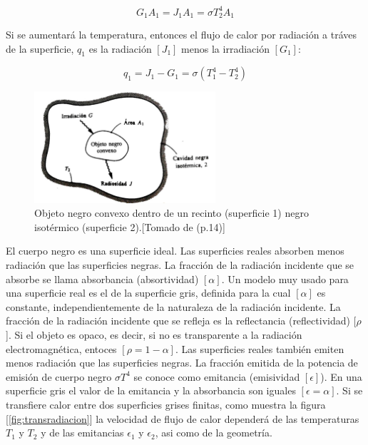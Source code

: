 \documentclass[12pt,letterpaper]{article}     %
\begin{document}
 \begin{equation}
 G_{1}A_{1} = J_{1}A_{1} = \sigma T_{2}^{4}A_{1} 
     \label{eq:Boltzmann2}
 \end{equation}
 
 Si se aumentará la temperatura, entonces el flujo de calor por radiación a tráves de la superficie, $q_{1}$ es la radiación $[J_{1}]$ menos la irradiación $[G_{1}]$:
 
 \begin{equation}
    q_{1}= J_{1}-G_{1} = \sigma (T_{1}^{4} - T_{2}^{4})
     \label{eq:Boltzmann3} 
 \end{equation}
 
 \begin{figure}[H]
\centering
\includegraphics[width=0.6\textwidth]{Imagines/objetonegroconvexo-nuevo.jpg}
\caption{Objeto negro convexo dentro de un recinto (superficie 1) negro isotérmico (superficie 2).[Tomado de \cite{Mills} (p.14)]}
\label{fig:objetonegroconvexo}
\end{figure}
 
 \cite[p\ 15-16]{Mills} El cuerpo negro es una superficie ideal. Las superficies reales absorben menos radiación que las superficies negras. La fracción de la radiación incidente que se absorbe se llama absorbancia (absortividad) $[\alpha]$. Un modelo muy usado para una superficie real es el de la superficie gris, definida para la cual $[\alpha]$ es constante, independientemente de la naturaleza de la radiación incidente. La fracción de la radiación incidente que se refleja es la reflectancia (reflectividad) [$\rho$]. Si el objeto es opaco, es decir, si no es transparente a la radiación electromagnética, entoces $[\rho = 1 - \alpha]$.
 Las superficies reales también emiten menos radiación que las superficies negras. La fracción emitida de la potencia de emisión de cuerpo negro $\sigma T^{4}$ se conoce como emitancia (emisividad $[\epsilon]$). En una superficie gris el valor de la emitancia y la absorbancia son iguales $[\epsilon = \alpha]$.
 Si se transfiere calor entre dos superficies grises finitas, como muestra la figura  [\ref{fig:transradiacion}] la velocidad de flujo de calor dependerá de las temperaturas $T_{1}$ y $T_{2}$ y de las emitancias $\epsilon_{1}$ y $\epsilon_{2}$, asi como de la geometría.
 
\end{document}
